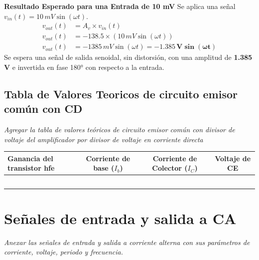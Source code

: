 \documentclass[11pt]{scrartcl}
\newcommand{\indicacion}[1]{\noindent\textit{\small #1}}
\begin{document}
\textbf{Resultado Esperado para una Entrada de 10 mV}
Se aplica una señal $v_{in}(t) = 10 \, mV \sin(\omega t)$.
\begin{align*}
    v_{out}(t) &= A_v \times v_{in}(t) \\
    v_{out}(t) &= -138.5 \times (10 \, mV \sin(\omega t)) \\
    v_{out}(t) &= -1385 \, mV \sin(\omega t) = \mathbf{-1.385 \, V \sin(\omega t)}
\end{align*}
Se espera una señal de salida senoidal, sin distorsión, con una amplitud de \textbf{1.385 V} e invertida en fase 180° con respecto a la entrada.


\subsection{Tabla de Valores Teoricos de circuito emisor común con CD}
\indicacion{
Agregar la tabla de valores teóricos de circuito emisor común con divisor de voltaje del amplificador por divisor de voltaje en corriente directa
}

\begin{center}
\begin{tabular}{|p{3cm}|c|c|c|}
\hline
\textbf{Ganancia del transistor hfe}& \textbf{Corriente de base ($I_b$)} & \textbf{Corriente de Colector ($I_C$)} & \textbf{Voltaje de CE}\\
\hline
& & & \\[4px]
\hline
& & & \\[4px]
\hline
& & & \\[4px]
\hline
& & & \\[4px]
\hline
& & & \\[4px]
\hline
\end{tabular}
\end{center}


\section{Señales de entrada y salida a CA}
\indicacion{
    Anexar las señales de entrada y salida a corriente alterna con sus parámetros de corriente, voltaje, periodo y frecuencia.
}

\begin{center}
\begin{tabular}{|p{6cm}|p{6cm}|}
\hline
&  \\[100px]
\hline
\end{tabular}
\end{center}
\end{document}
